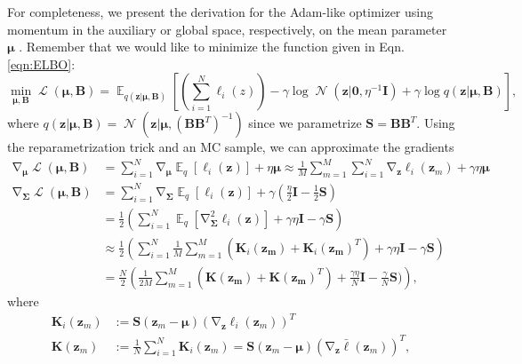 \documentclass[a4paper, 11pt, oneside]{scrartcl}
\theoremstyle{break}
\DeclareMathOperator{\Normal}{\mathcal{N}}
\DeclareMathOperator{\Expect}{\mathbb{E}}
\DeclareMathOperator{\grad}{\nabla}
\DeclareMathOperator{\ELBO}{\mathcal{L}}
\newcommand{\matr}[1]{\boldsymbol{#1}}
\numberwithin{equation}{section}
\begin{document}
				For completeness, we present the derivation for the Adam-like optimizer using momentum in the auxiliary or global space, respectively, on the mean parameter $\matr{\mu}$ \cite[Sec. E.3]{LSK20}. 
				Remember that we would like to minimize the function given in Eqn. \ref{eqn:ELBO}:
				\begin{equation}
					\min_{\matr{\mu}, \matr{B}} \ELBO(\matr{\mu}, \matr{B}) = \Expect_{q(\matr{z} | \matr{\mu}, \matr{B})} \left[ \left( \sum_{i=1}^N \ell_i(z) \right) - \gamma \log \Normal(\matr{z} | \matr{0}, \eta^{-1} \matr{I}) + \gamma \log q(\matr{z} | \matr{\mu}, \matr{B})\right],
					\label{eqn:ELBO_Objective}
				\end{equation}
				where $q(\matr{z} | \matr{\mu}, \matr{B}) = \Normal(\matr{z} | \matr{\mu}, (\matr{B} \matr{B}^T)^{-1})$ since we parametrize $\matr{S} = \matr{B} \matr{B}^T$.
				Using the reparametrization trick and an MC sample, we can approximate the gradients
				\begin{align*}
					\grad_{\matr{\mu}} \ELBO(\matr{\mu}, \matr{B}) &= \sum_{i=1}^N \grad_{\matr{\mu}}\Expect_q[\ell_i (\matr{z})] + \eta \matr{\mu} \approx \frac{1}{M} \sum_{m=1}^M \sum_{i=1}^N \grad_{\matr{z}} \ell_i (\matr{z}_m) + \gamma \eta \matr{\mu} \\
					\grad_{\matr{\Sigma}} \ELBO(\matr{\mu}, \matr{B}) &= \sum_{i=1}^N \grad_{\matr{\Sigma}} \Expect_q[\ell_i (\matr{z})] + \gamma \left( \frac{\eta}{2} \matr{I} - \frac{1}{2} \matr{S} \right) \\
					&= \frac{1}{2} \left( \sum_{i=1}^N \Expect_q[\grad_{\matr{\Sigma}}^2 \ell_i (\matr{z})] + \gamma \eta \matr{I} - \gamma \matr{S} \right) \\
					&\approx \frac{1}{2} \left( \sum_{i=1}^N \frac{1}{M} \sum_{m=1}^M (\matr{K}_i(\matr{z_m}) + \matr{K}_i(\matr{z_m})^T) + \gamma \eta \matr{I} - \gamma \matr{S} \right) \\
					&= \frac{N}{2} \left( \frac{1}{2 M} \sum_{m=1}^M (\matr{K}(\matr{z_m}) + \matr{K}(\matr{z_m})^T) + \frac{\gamma \eta}{N} \matr{I} - \frac{\gamma}{N} \matr{S}) \right),
				\end{align*}
				where 
				\begin{align*}
					\matr{K}_i(\matr{z}_m) &:= \matr{S} (\matr{z}_m - \matr{\mu}) (\grad_{\matr{z}} \ell_i (\matr{z}_m) )^T \\
					\matr{K}(\matr{z}_m) &:= \frac{1}{N} \sum_{i=1}^N \matr{K}_i(\matr{z}_m) = \matr{S} (\matr{z}_m - \matr{\mu}) (\grad_{\matr{z}} \bar{\ell} (\matr{z}_m) )^T,
				\end{align*}
\end{document}
